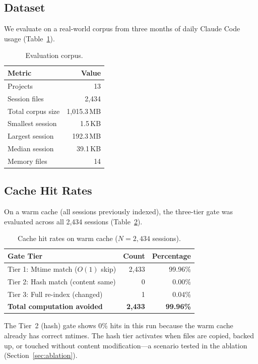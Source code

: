\documentclass[11pt]{article}
\begin{document}
\subsection{Dataset}

We evaluate on a real-world corpus from three months of daily Claude Code usage (Table~\ref{tab:dataset}).

\begin{table}[ht]
\centering
\caption{Evaluation corpus.}
\label{tab:dataset}
\begin{tabular}{lr}
\toprule
Metric & Value \\
\midrule
Projects & 13 \\
Session files & 2,434 \\
Total corpus size & 1,015.3\,MB \\
Smallest session & 1.5\,KB \\
Largest session & 192.3\,MB \\
Median session & 39.1\,KB \\
Memory files & 14 \\
\bottomrule
\end{tabular}
\end{table}

\subsection{Cache Hit Rates}

On a warm cache (all sessions previously indexed), the three-tier gate was evaluated across all 2,434 sessions (Table~\ref{tab:cachehits}).

\begin{table}[ht]
\centering
\caption{Cache hit rates on warm cache ($N = 2{,}434$ sessions).}
\label{tab:cachehits}
\begin{tabular}{lrr}
\toprule
Gate Tier & Count & Percentage \\
\midrule
Tier 1: Mtime match ($O(1)$ skip) & 2,433 & 99.96\% \\
Tier 2: Hash match (content same) & 0 & 0.00\% \\
Tier 3: Full re-index (changed) & 1 & 0.04\% \\
\midrule
\textbf{Total computation avoided} & \textbf{2,433} & \textbf{99.96\%} \\
\bottomrule
\end{tabular}
\end{table}

The Tier~2 (hash) gate shows 0\% hits in this run because the warm cache already has correct mtimes. The hash tier activates when files are copied, backed up, or touched without content modification---a scenario tested in the ablation (Section~\ref{sec:ablation}).
\end{document}
